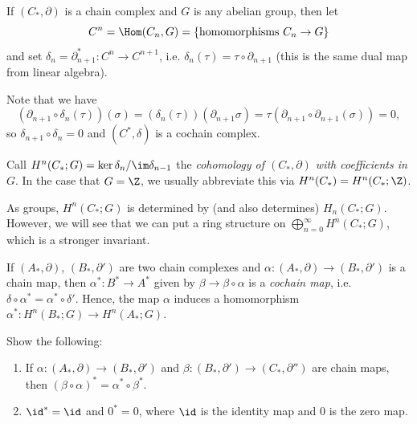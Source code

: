 \begin{definition}
  If $(C_*, \partial)$ is a chain complex and
  $G$ is any abelian group, then let
  \[
    C^n = \Hom(C_n, G) =
    \{\text{homomorphisms } C_n \to G\}
  \]
  and set $\delta_n = \partial_{n + 1}^* : C^n \to C^{n + 1}$,
  i.e. $\delta_n(\tau) = \tau \circ \partial_{n + 1}$ (this is the same dual map from linear algebra).
\end{definition}

\begin{remark}
  Note that we have
  \[
    (\partial_{n + 1} \circ \delta_n(\tau))(\sigma)
    = (\delta_n(\tau))(\partial_{n + 1} \sigma)
    = \tau(\partial_{n + 1} \circ \partial_{n + 1} (\sigma))
    = 0,
  \]
  so $\delta_{n + 1} \circ \delta_n = 0$
  and $(C^*, \delta)$ is a cochain complex.
\end{remark}

\begin{definition}
  Call $H^n(C_*; G) = \ker \delta_n / {\im \delta_{n - 1}}$
  the \emph{cohomology of $(C_*, \partial)$ with coefficients in $G$}. In the case that $G = \Z$,
  we usually abbreviate this via
  $H^n(C_*) = H^n(C_*; \Z)$.
\end{definition}

\begin{remark}
  As groups, $H^n(C_*; G)$ is
  determined by (and also determines)
  $H_n(C_*; G)$. However, we will see that we can
  put a ring structure on $\bigoplus_{n = 0}^\infty H^n(C_*; G)$,
  which is a stronger invariant.
\end{remark}

\begin{definition}
  If $(A_*, \partial)$, $(B_*, \partial')$ are
  two chain complexes and
  $\alpha : (A_*, \partial) \to (B_*, \partial')$
  is a chain map, then $\alpha^* : B^* \to A^*$
  given by $\beta \to \beta \circ \alpha$ is a
  \emph{cochain map}, i.e.
  $\delta \circ \alpha^* = \alpha^* \circ \delta'$.
  Hence, the map $\alpha$ induces a homomorphism
  $\alpha^* : H^n(B_*; G) \to H^n(A_*; G)$.
\end{definition}

\begin{exercise}
  Show the following:
  \begin{enumerate}
    \item If $\alpha : (A_*, \partial) \to (B_*, \partial')$
      and $\beta : (B_*, \partial') \to (C_*, \partial'')$
      are chain maps, then
      $(\beta \circ \alpha)^* = \alpha^* \circ \beta^*$.
    \item $\id^* = \id$ and
      $0^* = 0$, where $\id$ is the identity map
      and $0$ is the zero map.
  \end{enumerate}
\end{exercise}

